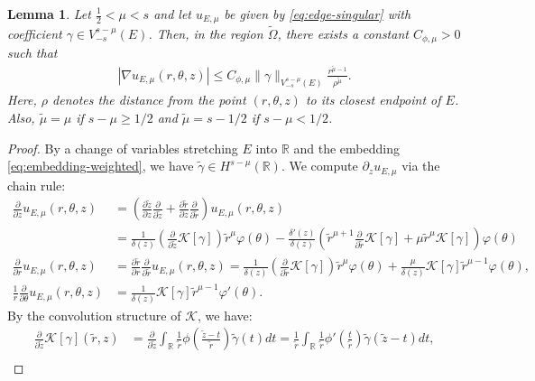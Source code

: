 ﻿\documentclass[11pt,reqno,oneside]{amsart}
\newtheorem{lemma}[theorem]{Lemma}
\theoremstyle{definition}
\theoremstyle{remark}
\newcommand{\R}{\mathbb{R}}
\newcommand{\n}{\nabla}
\renewcommand{\d}{\delta}
\newcommand{\g}{\gamma}
\newcommand{\vf}{\varphi}
\renewcommand{\t}{\theta}
\newcommand{\p}{\partial}
\renewcommand{\O}{\Omega}
\begin{document}
        \begin{lemma}\label{lemma:esti-grad-edge}
            Let $\frac{1}{2}<\mu<s$ and let $u_{E,\mu}$ be given by \eqref{eq:edge-singular} with coefficient $\g\in V_{-s}^{s-\mu}(E)$. Then, in the region $\widetilde{\O}$, there exists a constant $C_{\phi,\mu}>0$ such that
            \begin{align}\label{eq:esti-grad-edge}
                |\n u_{E,\mu}(r,\t,z)| \leq C_{\phi,\mu} \|\g\|_{V_{-s}^{s-\mu}(E)}\frac{r^{\widetilde{\mu}-1}}{\rho^{\widetilde{\mu}}}.
            \end{align}
            Here, $\rho$ denotes the distance from the point $(r,\t,z)$ to its closest endpoint of $E$. Also, $\widetilde{\mu}=\mu$ if $s-\mu\geq 1/2$ and $\widetilde{\mu}=s-1/2$ if $s-\mu<1/2$.
        \end{lemma}
        \begin{proof}
            By a change of variables stretching $E$ into $\R$ and the embedding \eqref{eq:embedding-weighted}, we have $\widetilde{\g}\in H^{s-\mu}(\R)$. We compute $\p_z u_{E,\mu}$ via the chain rule:
            \begin{align*}
                \frac{\p}{\p z}u_{E,\mu}(r,\t,z)&= \left(\frac{\p \widetilde{z}}{\p z}\frac{\p}{\p \widetilde{z}}+\frac{\p \widetilde{r}}{\p z}\frac{\p}{\p \widetilde{r}}\right) u_{E,\mu}(r,\t,z)\\
                &= \frac{1}{\d(z)}\left(\frac{\p}{\p \widetilde{z}}\mathcal{K}[\g]\right)\widetilde{r}^{\mu}\vf(\t)-\frac{\d'(z)}{\d(z)} \left(\widetilde{r}^{\mu+1} \frac{\p}{\p \widetilde{r}}\mathcal{K}[\g]+\mu \widetilde{r}^{\mu}\mathcal{K}[\g]\right) \vf(\t)\\
                \frac{\p}{\p r} u_{E,\mu}(r,\t,z) &= \frac{\p \widetilde{r}}{\p r}\frac{\p}{\p \widetilde{r}} u_{E,\mu}(r,\t,z)=\frac{1}{\d(z)}\left(\frac{\p}{\p \widetilde{r}}\mathcal{K}[\g]\right)\widetilde{r}^{\mu}\vf(\t)+\frac{\mu}{\d(z)} \mathcal{K}[\g]\widetilde{r}^{\mu-1}\vf(\t),\\
                \frac{1}{r} \frac{\p}{\p \t} u_{E,\mu}(r,\t,z) &= \frac{1}{\d(z)}\mathcal{K}[\g]\widetilde{r}^{\mu-1}\vf'(\t).
            \end{align*}
            By the convolution structure of $\mathcal{K}$, we have:
            \begin{align*}
                \frac{\p}{\p \widetilde{z}}\mathcal{K}[\g](\widetilde{r},z)& = \frac{\p}{\p \widetilde{z}}\int_\R \frac{1}{\widetilde{r}}\phi(\frac{\widetilde{z}-t}{\widetilde{r}})\widetilde{\g}(t)dt=\frac{1}{\widetilde{r}}\int_\R \frac{1}{\widetilde{r}}\phi'(\frac{t}{\widetilde{r}})\widetilde{\g}(\widetilde{z}-t) dt,\\

\end{align*}
\end{proof}
\end{document}
